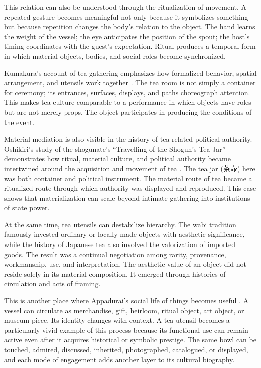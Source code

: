 \documentclass[numbers]{IntechOpen-Book}
\newcommand{\zh}[1]{{\CJKfontspec{Noto Serif CJK SC}\upshape #1}}
\begin{document}
This relation can also be understood through the ritualization of movement. A repeated gesture becomes meaningful not only because it symbolizes something but because repetition changes the body's relation to the object. The hand learns the weight of the vessel; the eye anticipates the position of the spout; the host's timing coordinates with the guest's expectation. Ritual produces a temporal form in which material objects, bodies, and social roles become synchronized.

Kumakura's account of tea gathering emphasizes how formalized behavior, spatial arrangement, and utensils work together \cite{kumakura}. The tea room is not simply a container for ceremony; its entrances, surfaces, displays, and paths choreograph attention. This makes tea culture comparable to a performance in which objects have roles but are not merely props. The object participates in producing the conditions of the event.

Material mediation is also visible in the history of tea-related political authority. Oshikiri's study of the shogunate's ``Travelling of the Shogun's Tea Jar'' demonstrates how ritual, material culture, and political authority became intertwined around the acquisition and movement of tea \cite{oshikiri}. The tea jar (\zh{茶壺}) here was both container and political instrument. The material route of tea became a ritualized route through which authority was displayed and reproduced. This case shows that materialization can scale beyond intimate gathering into institutions of state power.

At the same time, tea utensils can destabilize hierarchy. The wabi tradition famously invested ordinary or locally made objects with aesthetic significance, while the history of Japanese tea also involved the valorization of imported goods. The result was a continual negotiation among rarity, provenance, workmanship, use, and interpretation. The aesthetic value of an object did not reside solely in its material composition. It emerged through histories of circulation and acts of framing.

This is another place where Appadurai's social life of things becomes useful \cite{appadurai}. A vessel can circulate as merchandise, gift, heirloom, ritual object, art object, or museum piece. Its identity changes with context. A tea utensil becomes a particularly vivid example of this process because its functional use can remain active even after it acquires historical or symbolic prestige. The same bowl can be touched, admired, discussed, inherited, photographed, catalogued, or displayed, and each mode of engagement adds another layer to its cultural biography.
\end{document}
